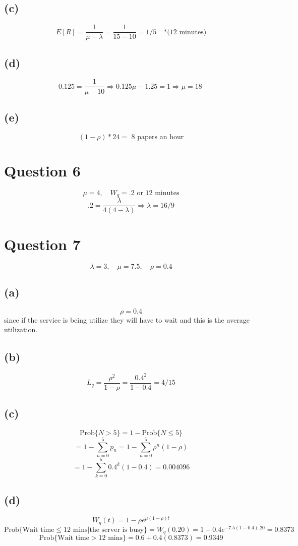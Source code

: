 \documentclass{article}
\begin{document}
\subsection*{(c)}
\[E[R]= \frac{1}{\mu - \lambda} = \frac{1}{15 - 10} = \boxed{1/5  \quad
\mbox{*(12 minutes)}}\]

\subsection*{(d)}
\[0.125 = \frac{1}{\mu - 10} \Rightarrow 0.125\mu - 1.25 = 1 \Rightarrow
\boxed{\mu = 18 }\
\]

\subsection*{(e)}
\[(1-\rho) * 24  = \boxed{\mbox{ 8 papers an hour}}\]

\section*{Question 6}
\[\mu = 4, \quad W_q = .2 \mbox{ or 12 minutes}\]
\[.2 = \frac{\lambda}{4(4-\lambda)} \Longrightarrow \boxed{ \lambda = 16/9} \]

\section*{Question 7}
\[ \lambda = 3, \quad \mu = 7.5, \quad \rho = 0.4 \]

\subsection*{(a)}
\[\boxed{ \rho = 0.4 }\]
since if the service is being utilize they will have to wait and this is the
average utilization. 
\subsection*{(b)}
\[L_q = \frac{\rho^2}{1-\rho} = \frac{0.4^2}{1-0.4} = \boxed{4/15}\]
\subsection*{(c)}
\[\mbox{Prob}\{N > 5\} = 1 - \mbox{Prob}\{N \leq 5\}\]
\[= 1 -\sum\limits_{n=0}^{5}p_n = 1 - \sum\limits_{n=0}^{5}{\rho^n(1 -
\rho)}\]\[ = 1 - \sum\limits_{k=0}^{5}{0.4^k(1 -
0.4)} = \boxed{0.004096} \]
\subsection*{(d)}
\[W_q(t) = 1 - \rho e^{\mu (1- \rho)t} \]
\[\mbox{Prob}\{\mbox{Wait time} \leq \mbox{12 mins} | \mbox{the server is busy}
\} = W_q(0.20) = 1 - 0.4 e^{-7.5 (1- 0.4).20} = 0.8373 \] \[\mbox{Prob}\{
\mbox{Wait time} > \mbox{12 mins} \} = 0.6 + 0.4(0.8373) = \boxed{0.9349}\]
\end{document}
